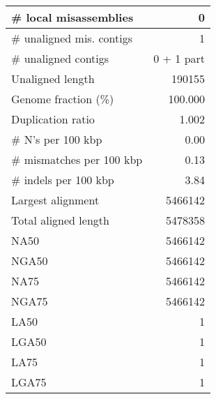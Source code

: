 \documentclass[12pt,a4paper]{article}
\begin{document}
\begin{table}[ht]
\begin{center}
\begin{tabular}{|l*{1}{|r}|}
\# local misassemblies & 0 \\ \hline
\# unaligned mis. contigs & 1 \\ \hline
\# unaligned contigs & 0 + 1 part \\ \hline
Unaligned length & 190155 \\ \hline
Genome fraction (\%) & 100.000 \\ \hline
Duplication ratio & 1.002 \\ \hline
\# N's per 100 kbp & 0.00 \\ \hline
\# mismatches per 100 kbp & 0.13 \\ \hline
\# indels per 100 kbp & 3.84 \\ \hline
Largest alignment & 5466142 \\ \hline
Total aligned length & 5478358 \\ \hline
NA50 & 5466142 \\ \hline
NGA50 & 5466142 \\ \hline
NA75 & 5466142 \\ \hline
NGA75 & 5466142 \\ \hline
LA50 & 1 \\ \hline
LGA50 & 1 \\ \hline
LA75 & 1 \\ \hline
LGA75 & 1 \\ \hline
\end{tabular}
\end{center}
\end{table}
\end{document}

